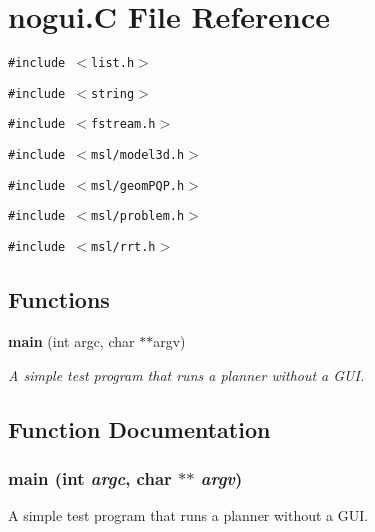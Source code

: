 \section{nogui.C File Reference}
\label{nogui_8C}
{\tt \#include $<$list.h$>$}\par
{\tt \#include $<$string$>$}\par
{\tt \#include $<$fstream.h$>$}\par
{\tt \#include $<$msl/model3d.h$>$}\par
{\tt \#include $<$msl/geom\-PQP.h$>$}\par
{\tt \#include $<$msl/problem.h$>$}\par
{\tt \#include $<$msl/rrt.h$>$}\par
\subsection*{Functions}
\begin{CompactItemize}
\item 
{\bf main} (int argc, char $\ast$$\ast$argv)
\begin{CompactList}\small\item\em A simple test program that runs a planner without a GUI.\item\end{CompactList}\end{CompactItemize}


\subsection{Function Documentation}
\subsubsection{\setlength{\rightskip}{0pt plus 5cm}main (int {\em argc}, char $\ast$$\ast$ {\em argv})}\label{nogui_8C_a0}


A simple test program that runs a planner without a GUI.

